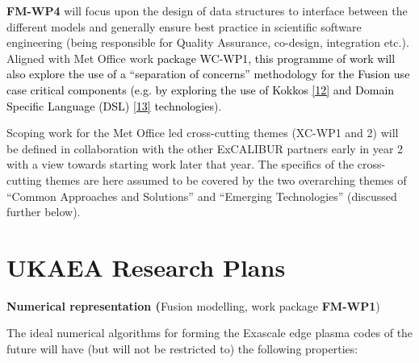\documentclass[a4paper]{article}
\newcommand\textstyleInternetlink[1]{\textcolor{blue}{#1}}
\begin{document}
\bigskip

\textbf{FM-WP4} will focus upon the design of data structures to interface between the different models and generally
ensure best practice in scientific software engineering (being responsible for Quality Assurance, co-design,
integration etc.). Aligned with Met Office work \textcolor{black}{package WC-WP1, this programme of work will also
explore the use of a ``separation of concerns'' methodology for the Fusion use case critical components (e.g. by
exploring the use of Kokkos
}\href{https://cfwebprod.sandia.gov/cfdocs/CompResearch/docs/Kokkos-Multi-CoE.pdf}{\textstyleInternetlink{\textcolor{black}{[12]}}}\textcolor{black}{
and Domain Specific Language (DSL)
}\href{https://en.wikipedia.org/wiki/Domain-specific_language}{\textstyleInternetlink{\textcolor{black}{[13]}}}\textcolor{black}{
technologies}).


\bigskip

Scoping work for the Met Office led cross-cutting themes (XC-WP1 and 2) will be defined in collaboration with the other
ExCALIBUR partners early in year 2 with a view towards starting work later that year. The specifics of the
cross-cutting themes are here assumed to be covered by the two overarching themes of ``Common Approaches and
Solutions'' and ``Emerging Technologies'' (discussed further below).


\bigskip


\bigskip

\section[UKAEA Research Plans]{\textcolor[rgb]{0.12156863,0.28627452,0.49019608}{UKAEA Research Plans}}

\bigskip

\textbf{\textcolor[rgb]{0.12156863,0.28627452,0.49019608}{Numerical representation
(}}\textcolor[rgb]{0.12156863,0.28627452,0.49019608}{Fusion modelling, work package
}\textbf{\textcolor[rgb]{0.12156863,0.28627452,0.49019608}{FM-WP1}}\textcolor[rgb]{0.12156863,0.28627452,0.49019608}{)}


\bigskip

The ideal numerical algorithms for forming the Exascale edge plasma codes of the future will have (but will not be
restricted to) the following properties:


\bigskip


\bigskip
\end{document}
